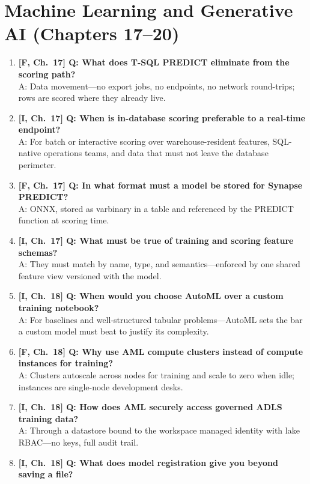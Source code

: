 \section{Machine Learning and Generative AI (Chapters 17--20)}

\begin{enumerate}
    \item \textbf{[F, Ch.~17] Q: What does T-SQL PREDICT eliminate from the scoring path?}\\
    A: Data movement---no export jobs, no endpoints, no network round-trips; rows are scored where they already live.
    \item \textbf{[I, Ch.~17] Q: When is in-database scoring preferable to a real-time endpoint?}\\
    A: For batch or interactive scoring over warehouse-resident features, SQL-native operations teams, and data that must not leave the database perimeter.
    \item \textbf{[F, Ch.~17] Q: In what format must a model be stored for Synapse PREDICT?}\\
    A: ONNX, stored as varbinary in a table and referenced by the PREDICT function at scoring time.
    \item \textbf{[I, Ch.~17] Q: What must be true of training and scoring feature schemas?}\\
    A: They must match by name, type, and semantics---enforced by one shared feature view versioned with the model.
    \item \textbf{[I, Ch.~18] Q: When would you choose AutoML over a custom training notebook?}\\
    A: For baselines and well-structured tabular problems---AutoML sets the bar a custom model must beat to justify its complexity.
    \item \textbf{[F, Ch.~18] Q: Why use AML compute clusters instead of compute instances for training?}\\
    A: Clusters autoscale across nodes for training and scale to zero when idle; instances are single-node development desks.
    \item \textbf{[I, Ch.~18] Q: How does AML securely access governed ADLS training data?}\\
    A: Through a datastore bound to the workspace managed identity with lake RBAC---no keys, full audit trail.
    \item \textbf{[I, Ch.~18] Q: What does model registration give you beyond saving a file?}\\

\end{enumerate}
